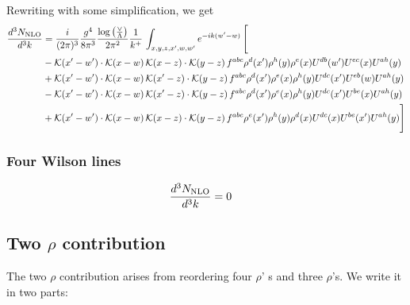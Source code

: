 \documentclass[aps,prd,amsmath,amssymb,nofootinbib]{revtex4-2}
\numberwithin{equation}{section}
\begin{document}
Rewriting with some simplification, we get
\begin{align}
      \frac{d^{3}N_{\rm NLO}}{d^{3}k} & = \frac{i}{(2\pi)^{3}}\frac{g^{4}}{8\pi^{3}}\frac{\log{\left(\frac{\vee}{\Lambda}\right)}}{2\pi^{2}} \frac{1}{k^{+}}\,\int_{x,y,z,x^{\prime},w,w^{\prime}}e^{-ik(w^{\prime}-w)}\, \Bigg[\notag \\ & - \mathcal{K}(x'-w')\cdot \mathcal{K}(x-w)\, \mathcal{K}(x-z)\cdot \mathcal{K}(y-z)\, f^{a b c} \rho^{d}(x') \rho^{h}(y) \rho^{e}(x) U^{d b}(w') U^{e c}(x) U^{a h}(y)\nonumber\\
    &+ \mathcal{K}(x'-w')\cdot \mathcal{K}(x-w)\,\mathcal{K}(x'-z)\cdot \mathcal{K}(y-z)\, f^{a b c} \rho^{d}(x') \rho^{e}(x) \rho^{h}(y) U^{d c}(x') U^{e b}(w) U^{a h}(y)\nonumber\\
    &- \mathcal{K}(x'-w')\cdot \mathcal{K}(x-w)\,\mathcal{K}(x'-z)\cdot \mathcal{K}(y-z)\, f^{a b c} \rho^{d}(x') \rho^{e}(x) \rho^{h}(y) U^{d c}(x') U^{b e}(x) U^{a h}(y)\nonumber\\
    &+  \mathcal{K}(x'-w')\cdot \mathcal{K}(x-w)\, \mathcal{K}(x-z)\cdot \mathcal{K}(y-z)\, f^{a b c} \rho^{e}(x') \rho^{h}(y) \rho^{d}(x) U^{d c}(x) U^{b e}(x') U^{a h}(y) \Bigg]
\end{align}
\subsubsection{Four Wilson lines}
\begin{align}
    \frac{d^{3}N_{\rm NLO}}{d^{3}k} & = 0 
\end{align}    
\subsection{Two $\rho$ contribution}
The two $\rho$ contribution arises from reordering four $\rho$' s and three $\rho$'s. We write it in two parts:
\end{document}
